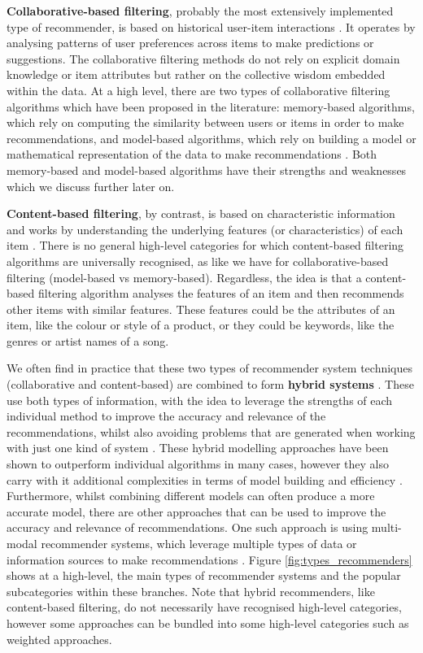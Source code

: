 \textbf{Collaborative-based filtering}, probably the most extensively implemented type of recommender, is based on historical user-item interactions \cite{thorat2015survey}. It operates by analysing patterns of user preferences across items to make predictions or suggestions. The collaborative filtering methods do not rely on explicit domain knowledge or item attributes but rather on the collective wisdom embedded within the data. At a high level, there are two types of collaborative filtering algorithms which have been proposed in the literature: memory-based algorithms, which rely on computing the similarity between users or items in order to make recommendations, and model-based algorithms, which rely on building a model or mathematical representation of the data to make recommendations \cite{thorat2015survey}. Both memory-based and model-based algorithms have their strengths and weaknesses which we discuss further later on. 

\textbf{Content-based filtering}, by contrast, is based on characteristic information and works by understanding the underlying features (or characteristics) of each item \cite{thorat2015survey}. There is no general high-level categories for which content-based filtering algorithms are universally recognised, as like we have for collaborative-based filtering (model-based vs memory-based). Regardless, the idea is that a content-based filtering algorithm analyses the features of an item and then recommends other items with similar features. These features could be the attributes of an item, like the colour or style of a product, or they could be keywords, like the genres or artist names of a song. 

We often find in practice that these two types of recommender system techniques (collaborative and content-based) are combined to form \textbf{hybrid systems} \cite{thorat2015survey}. These use both types of information, with the idea to leverage the strengths of each individual method to improve the accuracy and relevance of the recommendations, whilst also avoiding problems that are generated when working with just one kind of system \cite{thorat2015survey}. These hybrid modelling approaches have been shown to outperform individual algorithms in many cases, however they also carry with it additional complexities in terms of model building and efficiency \cite{ccano2017hybrid}. Furthermore, whilst combining different models can often produce a more accurate model, there are other approaches that can be used to improve the accuracy and relevance of recommendations. One such approach is using multi-modal recommender systems, which leverage multiple types of data or information sources to make recommendations \cite{ccano2017hybrid}. Figure \ref{fig:types_recommenders} shows at a high-level, the main types of recommender systems and the popular subcategories within these branches. Note that hybrid recommenders, like content-based filtering, do not necessarily have recognised high-level categories, however some approaches can be bundled into some high-level categories such as weighted approaches.

